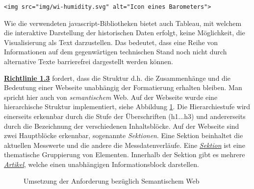 \begin{lstlisting}[label=lst:altImg,caption=Alternativtext für Icons, language=HTML5, style=htmlcssjs]
<img src="img/wi-humidity.svg" alt="Icon eines Barometers">
\end{lstlisting}

\noindent
Wie die verwendeten javascript-Bibliotheken bietet auch Tableau, mit welchem die interaktive Darstellung der historischen Daten erfolgt, keine Möglichkeit, die Visualisierung als Text darzustellen. Das bedeutet, dass eine Reihe von Informationen auf dem gegenwärtigen technischen Stand noch nicht durch alternative Texte barrierefrei dargestellt werden können. \newline

\noindent
\href{https://www.w3.org/Translations/WCAG20-de/#text-equiv}{\textbf{Richtlinie 1.3}} fordert, dass die Struktur d.h. die Zusammenhänge und die Bedeutung einer Webseite unabhängig der Formatierung erhalten bleiben. Man spricht hier auch von \emph{semantischem} Web. Auf der Webseite wurde eine hierarchische Struktur implementiert, siehe Abbildung \ref{img:semWeb}. Die Hierarchiestufe wird einerseits erkennbar durch die Stufe der Überschriften (h1...h3) und andererseits durch die Bezeichnung der verschiedenen Inhaltsblöcke. Auf der Webseite sind zwei Hauptblöcke erkennbar, sogenannte \emph{Sektionen}. Eine Sektion beinhaltet die aktuellen Messwerte und die andere die Messdatenverläufe. Eine \href{https://www.w3.org/TR/2011/WD-html5-20110525/sections.html#the-section-element}{\emph{Sektion}} ist eine thematische Gruppierung von Elementen. Innerhalb der Sektion gibt es mehrere \href{https://www.w3.org/TR/2011/WD-html5-20110525/sections.html#the-article-element}{\emph{Artikel}}, welche einen unabhängigen Informationsblock darstellen.
\newpage

\begin{figure}[h!]
	\centering
	\caption{Umsetzung der Anforderung bezüglich Semantischem Web}
	\label{img:semWeb}
\end{figure}

